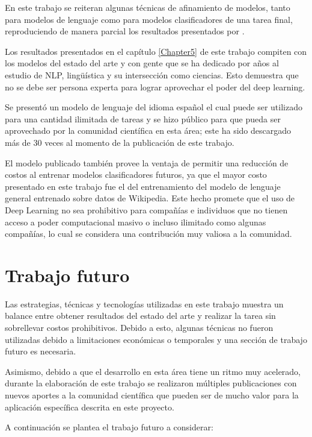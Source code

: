 En este trabajo se reiteran algunas técnicas de afinamiento de modelos, tanto para modelos de lenguaje como para modelos clasificadores de una tarea final, reproduciendo de manera parcial los resultados presentados por \citeauthor{howard2018}.

Los resultados presentados en el capítulo \ref{Chapter5} de este trabajo compiten con los modelos del estado del arte y con gente que se ha dedicado por años al estudio de NLP, lingüística y su intersección como ciencias. Esto demuestra que no se debe ser persona experta para lograr aprovechar el poder del deep learning.

Se presentó un modelo de lenguaje del idioma español el cual puede ser utilizado para una cantidad ilimitada de tareas y se hizo público para que pueda ser aprovechado por la comunidad científica en esta área; este ha sido descargado más de 30 veces al momento de la publicación de este trabajo.

El modelo publicado también provee la ventaja de permitir una reducción de costos al entrenar modelos clasificadores futuros, ya que el mayor costo presentado en este trabajo fue el del entrenamiento del modelo de lenguaje general entrenado sobre datos de Wikipedia. Este hecho promete que el uso de Deep Learning no sea prohibitivo para compañías e individuos que no tienen acceso a poder computacional masivo o incluso ilimitado como algunas compañías, lo cual se considera una contribución muy valiosa a la comunidad.

\section{Trabajo futuro}

Las estrategias, técnicas y tecnologías utilizadas en este trabajo muestra un balance entre obtener resultados del estado del arte y realizar la tarea sin sobrellevar costos prohibitivos. Debido a esto, algunas técnicas no fueron utilizadas debido a limitaciones económicas o temporales y una sección de trabajo futuro es necesaria.

Asimismo, debido a que el desarrollo en esta área tiene un ritmo muy acelerado, durante la elaboración de este trabajo se realizaron múltiples publicaciones con nuevos aportes a la comunidad científica que pueden ser de mucho valor para la aplicación específica descrita en este proyecto.

A continuación se plantea el trabajo futuro a considerar:

